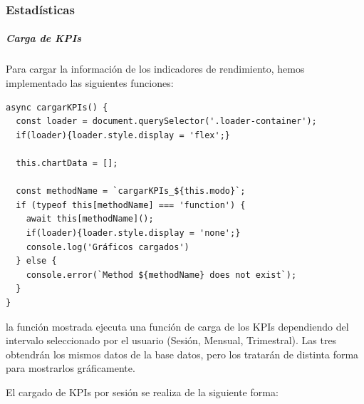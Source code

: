 \subsubsection{Estadísticas}
\subparagraph{Carga de KPIs}
Para cargar la información de los indicadores de rendimiento, hemos implementado las siguientes funciones:

\begin{lstlisting}[style=Javascript-color, caption={Carga de la información de los KPIs},label=Javascript-color_code_kpis]
async cargarKPIs() {
  const loader = document.querySelector('.loader-container');
  if(loader){loader.style.display = 'flex';}

  this.chartData = [];

  const methodName = `cargarKPIs_${this.modo}`;
  if (typeof this[methodName] === 'function') {
    await this[methodName]();
    if(loader){loader.style.display = 'none';}
    console.log('Gráficos cargados')
  } else {
    console.error(`Method ${methodName} does not exist`);
  }
}
\end{lstlisting}

la función mostrada ejecuta una función de carga de los KPIs dependiendo del intervalo seleccionado por el usuario (Sesión, Mensual, Trimestral). Las tres obtendrán los mismos datos de la base datos, pero los tratarán de distinta forma para mostrarlos gráficamente.

El cargado de KPIs por sesión se realiza de la siguiente forma:

